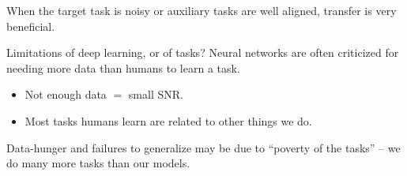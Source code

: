 \documentclass{beamer}
\begin{document}
\begin{frame}[standout]
When the target task is noisy or auxiliary tasks are well aligned, transfer is very beneficial.
\end{frame}

\begin{frame}[fragile]{Limitations of deep learning, or of tasks?}
Neural networks are often criticized for needing more data than humans to learn a task. 
\begin{itemize}
\item<2-> Not enough data $=$ small SNR.
\item<3-> Most tasks humans learn are related to other things we do. 
\end{itemize}
\end{frame}

\begin{frame}[standout]
Data-hunger and failures to generalize may be due to ``poverty of the tasks'' -- we do many more tasks than our models.\par
\end{frame}
\end{document}
